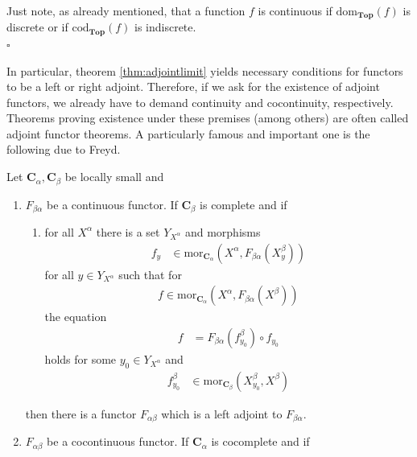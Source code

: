 \begin{prf}
Just note, as already mentioned, that a function $f$ is continuous if $\mathrm{dom}_{\mathbf{Top}}(f)$ is discrete or if $\mathrm{cod}_{\mathbf{Top}}(f)$ is indiscrete.
\\
\phantom{proven}
\hfill
$\square$
\end{prf}
In particular, theorem \ref{thm:adjointlimit} yields necessary conditions for functors to be a left or right adjoint.
Therefore, if we ask for the existence of adjoint functors, we already have to demand continuity and cocontinuity, respectively.
Theorems proving existence under these premises (among others) are often called adjoint functor theorems.
A particularly famous and important one is the following due to Freyd.
\\
\begin{thm}[Freyd]
\label{thm:aftfreyd}
Let $\mathbf{C}_{\alpha},\mathbf{C}_{\beta}$ be locally small and
\begin{enumerate}
\item[(1T)]
$F_{\beta\alpha}$ be a continuous functor.
If $\mathbf{C}_{\beta}$ is complete and if
\begin{enumerate}
\item[(SSC)]
for all $X^{\alpha}$ there is a set $Y_{X^{\alpha}}$ and morphisms
\begin{align*}
  f_{y}
  &\in
  \mathrm{mor}_{\mathbf{C}_{\alpha}}
  \left(
    X^{\alpha},
    F_{\beta\alpha}(X_{y}^{\beta})
  \right)
\end{align*}
for all $y \in Y_{X^{\alpha}}$ such that for
\begin{align*}
  f
  \in
  \mathrm{mor}_{\mathbf{C}_{\alpha}}
  \left(
    X^{\alpha},
    F_{\beta\alpha}(X^{\beta})
  \right)
\end{align*}
the equation
\begin{align*}
  f
  &=
  F_{\beta\alpha}(f_{y_{0}}^{\beta})
  \circ
  f_{y_{0}}
\end{align*}
holds for some $y_{0} \in Y_{X^{\alpha}}$ and
\begin{align*}
  f_{y_{0}}^{\beta}
  &\in
  \mathrm{mor}_{\mathbf{C}_{\beta}}
  \left(
    X_{y_{0}}^{\beta},
    X^{\beta}
  \right)
\end{align*}
\end{enumerate}
then there is a functor $F_{\alpha\beta}$ which is a left adjoint to $F_{\beta\alpha}$.
\item[(1I)]
$F_{\alpha\beta}$ be a cocontinuous functor.
If $\mathbf{C}_{\alpha}$ is cocomplete and if
\begin{enumerate}

\end{enumerate}
\end{enumerate}
\end{thm}
